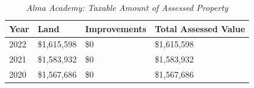\begin{table}[hbtp]
  \SingleSpacing%
  \caption[Alma Academy: Taxable Amount of Assessed Propery]{\textit{Alma Academy: Taxable Amount of Assessed Property}}%
  \label{tab:alma-academy-taxable-amount}
  \begin{tabular}{llll}
    \toprule
    Year & Land        & Improvements & Total Assessed Value \\
    \midrule
    2022 & \$1,615,598 & \$0          & \$1,615,598 \\
    2021 & \$1,583,932 & \$0          & \$1,583,932 \\
    2020 & \$1,567,686 & \$0          & \$1,567,686 \\
    \bottomrule
  \end{tabular}\\\newline
\end{table}

